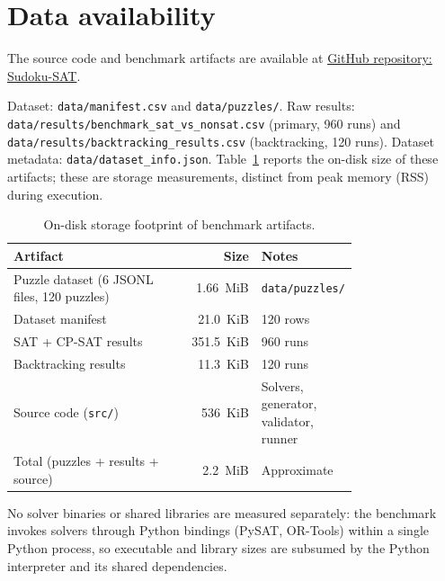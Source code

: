 \documentclass[a4paper,fleqn]{cas-sc}
\newcommand{\code}[1]{\texttt{\nolinkurl{#1}}}
\begin{document}
\section*{Data availability}

The source code and benchmark artifacts are available at
\href{https://github.com/FatPandaC8/Sudoku-SAT}{GitHub repository: Sudoku-SAT}.

Dataset: \code{data/manifest.csv} and \code{data/puzzles/}. Raw results: \code{data/results/benchmark_sat_vs_nonsat.csv} (primary, 960 runs) and \code{data/results/backtracking_results.csv} (backtracking, 120 runs). Dataset metadata: \code{data/dataset_info.json}. Table~\ref{tab:storage} reports the on-disk size of these artifacts; these are storage measurements, distinct from peak memory (RSS) during execution.

\begin{table}[htbp]
\centering
\caption{On-disk storage footprint of benchmark artifacts.}
\label{tab:storage}
\small
\begin{tabular}{p{0.48\linewidth}rp{0.28\linewidth}}
\toprule
Artifact & Size & Notes \\
\midrule
Puzzle dataset (6 JSONL files, 120 puzzles) & 1.66~MiB & \code{data/puzzles/} \\
Dataset manifest & 21.0~KiB & 120 rows \\
SAT + CP-SAT results & 351.5~KiB & 960 runs \\
Backtracking results & 11.3~KiB & 120 runs \\
Source code (\code{src/}) & 536~KiB & Solvers, generator, validator, runner \\
\midrule
Total (puzzles + results + source) & 2.2~MiB & Approximate \\
\bottomrule
\end{tabular}
\end{table}

No solver binaries or shared libraries are measured separately: the benchmark invokes solvers through Python bindings (PySAT, OR-Tools) within a single Python process, so executable and library sizes are subsumed by the Python interpreter and its shared dependencies.




\end{document}

